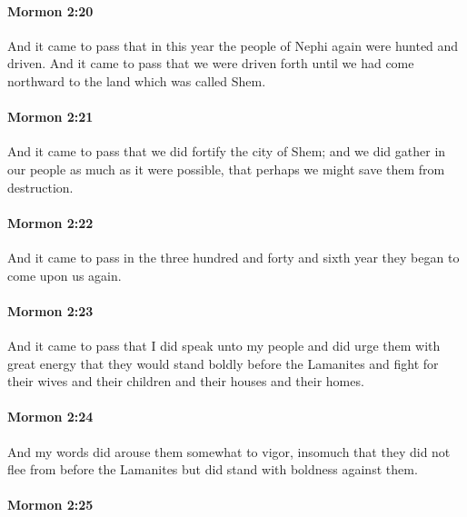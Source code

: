 		\paragraph{Mormon 2:20} %
			\label{MORMON-2-20}

			And it came to pass that in this year
			the people of Nephi again were hunted and driven.
			And it came to pass that we were driven forth
			until we had come northward to the land which was called Shem.

		\paragraph{Mormon 2:21} %
			\label{MORMON-2-21}

			And it came to pass that we did fortify the city of Shem;
			and we did gather in our people as much as it were possible,
			that perhaps we might save them from destruction.

		\paragraph{Mormon 2:22} %
			\label{MORMON-2-22}

			And it came to pass in the three hundred and forty and sixth year
			they began to come upon us again.

		\paragraph{Mormon 2:23} %
			\label{MORMON-2-23}

			And it came to pass that I did speak unto my people
			and did urge them with great energy
			that they would stand boldly before the Lamanites
			and fight for their wives and their children
			and their houses and their homes.

		\paragraph{Mormon 2:24} %
			\label{MORMON-2-24}

			And my words did arouse them somewhat to vigor,
			insomuch that they did not flee from before the Lamanites
			but did stand with boldness against them.

		\paragraph{Mormon 2:25} %
			\label{MORMON-2-25}

